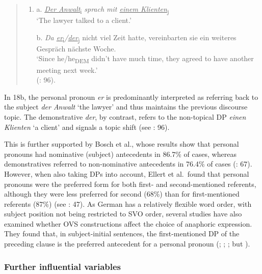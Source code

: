 \documentclass[
  letterpaper,
  DIV=11,
  numbers=noendperiod]{scrartcl}
\begin{document}
\begin{quote}
\begin{enumerate}
\def\labelenumi{\arabic{enumi}.}
\setcounter{enumi}{17}
\item
  a. \ul{\emph{Der Anwalt}}\textsubscript{i} \emph{sprach mit \ul{einem
  Klienten}}\textsubscript{j}\\
  `The lawyer talked to a client.'

  b. \emph{Da \ul{er}}\textsubscript{i}\emph{/\ul{der}}\textsubscript{j}
  nicht viel Zeit hatte, vereinbarten sie ein weiteres Gespräch nächste
  Woche.\\
  `Since he/he\textsubscript{DEM} didn't have much time, they agreed to
  have another meeting next week.'\\
  (: 96).
\end{enumerate}
\end{quote}

In 18b, the personal pronoun \emph{er} is predominantly interpreted as
referring back to the subject \emph{der Anwalt} `the lawyer' and thus
maintains the previous discourse topic. The demonstrative \emph{der}, by
contrast, refers to the non-topical DP \emph{einen Klienten} `a client'
and signals a topic shift (see : 96).

This is further supported by Bosch et al., whose results show that
personal pronouns had nominative (subject) antecedents in 86.7\% of
cases, whereas demonstratives referred to non-nominative antecedents in
76.4\% of cases (: 67).
However, when also taking DPs into account, Ellert et al.~found that
personal pronouns were the preferred form for both first- and
second-mentioned referents, although they were less preferred for second
(68\%) than for first-mentioned referents (87\%) (see
: 47). As German has a
relatively flexible word order, with subject position not being
restricted to SVO order, several studies have also examined whether OVS
constructions affect the choice of anaphoric expression. They found
that, in subject-initial sentences, the first-mentioned DP of the
preceding clause is the preferred antecedent for a personal pronoun
(;
;
; but
).

\subsubsection{Further influential variables}\label{sec-ClauseType}
\end{document}
